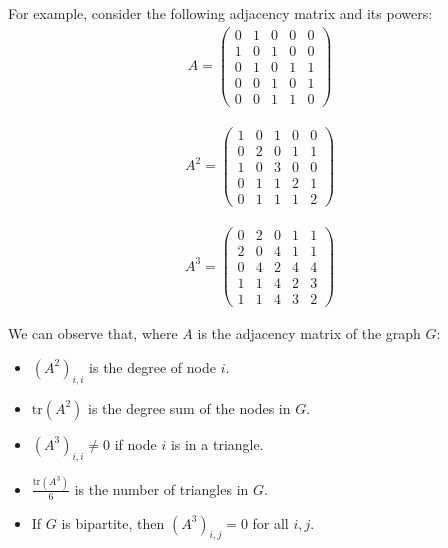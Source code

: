 \documentclass[a4paper,11pt]{article}
\begin{document}
For example, consider the following adjacency matrix and its powers:
\begin{align*}
A =
\begin{pmatrix}
    0 & 1 & 0 & 0 & 0 \\
    1 & 0 & 1 & 0 & 0 \\
    0 & 1 & 0 & 1 & 1 \\
    0 & 0 & 1 & 0 & 1 \\
    0 & 0 & 1 & 1 & 0
\end{pmatrix}
\end{align*}

\begin{align*}
A^2 =
\begin{pmatrix}
    1 & 0 & 1 & 0 & 0 \\
    0 & 2 & 0 & 1 & 1 \\
    1 & 0 & 3 & 0 & 0 \\
    0 & 1 & 1 & 2 & 1 \\
    0 & 1 & 1 & 1 & 2
\end{pmatrix}
\end{align*}

\begin{align*}
A^3 =
\begin{pmatrix}
    0 & 2 & 0 & 1 & 1 \\
    2 & 0 & 4 & 1 & 1 \\
    0 & 4 & 2 & 4 & 4 \\
    1 & 1 & 4 & 2 & 3 \\
    1 & 1 & 4 & 3 & 2
\end{pmatrix}
\end{align*}

We can observe that, where $A$ is the adjacency matrix of the graph $G$:
\begin{itemize}
    \item   $(A^2)_{i,i}$ is the degree of node $i$.
    \item   $\text{tr}(A^2)$ is the degree sum of the nodes in $G$.
    \item   $(A^3)_{i,i} \neq 0 $ if node $i$ is in a triangle.
    \item   $\frac{\text{tr}(A^3)}{6}$ is the number of triangles in $G$.
    \item   If $G$ is bipartite, then $(A^3)_{i,j} = 0$ for all $i,j$.
\end{itemize}
\end{document}

